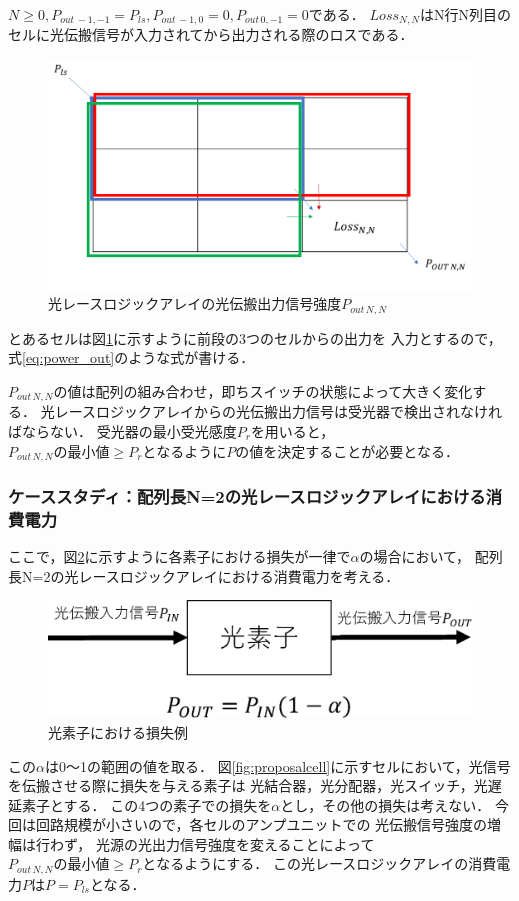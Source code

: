 $N \geq 0,P_{out\,-1,-1}=P_{ls},P_{out\,-1,0}=0,P_{out\,0,-1}=0である．$
$Loss_{N,N}$はN行N列目のセルに光伝搬信号が入力されてから出力される際のロスである．
\begin{figure}[t!]
\begin{center}
\includegraphics[keepaspectratio,scale=0.5]{fig/4/nanopower.png}
\caption{光レースロジックアレイの光伝搬出力信号強度$P_{out\,N,N}$}
\label{fig:nanopower}
\end{center}
\end{figure}
とあるセルは図\ref{fig:nanopower}に示すように前段の3つのセルからの出力を
入力とするので，式\ref{eq:power_out}のような式が書ける．

$P_{out\,N,N}$の値は配列の組み合わせ，即ちスイッチの状態によって大きく変化する．
光レースロジックアレイからの光伝搬出力信号は受光器で検出されなければならない．
受光器の最小受光感度$P_{r}$を用いると，
$P_{out\,N,N}の最小値 \geq P_{r}となるようにP$の値を決定することが必要となる．

\subsubsection{ケーススタディ：配列長N=2の光レースロジックアレイにおける消費電力}
ここで，図\ref{fig:loss}に示すように各素子における損失が一律で$\alpha$の場合において，
配列長N=2の光レースロジックアレイにおける消費電力を考える．
\begin{figure}[t!]
\begin{center}
\includegraphics[keepaspectratio,scale=0.5]{fig/4/loss.eps}
\caption{光素子における損失例}
\label{fig:loss}
\end{center}
\end{figure}
この$\alpha$は0〜1の範囲の値を取る．
図\ref{fig:proposalcell}に示すセルにおいて，光信号を伝搬させる際に損失を与える素子は
光結合器，光分配器，光スイッチ，光遅延素子とする．
この4つの素子での損失を$\alpha$とし，その他の損失は考えない．
今回は回路規模が小さいので，各セルのアンプユニットでの
光伝搬信号強度の増幅は行わず，
光源の光出力信号強度を変えることによって$P_{out\,N,N}の最小値 \geq P_{r}となるように$する．
この光レースロジックアレイの消費電力$PはP=P_{ls}$となる．

